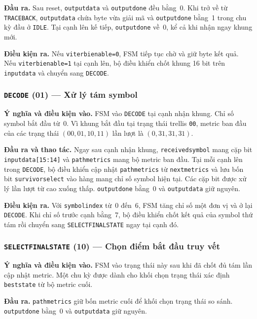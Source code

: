 \documentclass[12pt,a4paper]{article}
\renewcommand{\_}{\originalunderscore\allowbreak}
\begin{document}
\textbf{Đầu ra.} Sau reset, \texttt{output\_data} và \texttt{output\_done} đều bằng~0. Khi trở về từ \texttt{TRACEBACK}, \texttt{output\_data} chứa byte vừa giải mã và \texttt{output\_done} bằng~1 trong chu kỳ đầu ở \texttt{IDLE}. Tại cạnh lên kế tiếp, \texttt{output\_done} về~0, kể cả khi nhận ngay khung mới.

\textbf{Điều kiện ra.} Nếu \texttt{viterbi\_enable=0}, FSM tiếp tục chờ và giữ byte kết quả. Nếu \texttt{viterbi\_enable=1} tại cạnh lên, bộ điều khiển chốt khung 16 bit trên \texttt{input\_data} và chuyển sang \texttt{DECODE}.

\subsubsection{\texttt{DECODE} (01) --- Xử lý tám symbol}
\textbf{Ý nghĩa và điều kiện vào.} FSM vào \texttt{DECODE} tại cạnh nhận khung. Chỉ số symbol bắt đầu từ~0. Vì khung bắt đầu tại trạng thái trellis \texttt{00}, metric ban đầu của các trạng thái $(00,01,10,11)$ lần lượt là $(0,31,31,31)$.

\textbf{Đầu ra và thao tác.} Ngay sau cạnh nhận khung, \texttt{received\_symbol} mang cặp bit \texttt{input\_data[15:14]} và \texttt{path\_metrics} mang bộ metric ban đầu. Tại mỗi cạnh lên trong \texttt{DECODE}, bộ điều khiển cập nhật \texttt{path\_metrics} từ \texttt{next\_metrics} và lưu bốn bit \texttt{survivor\_select} vào hàng mang chỉ số symbol hiện tại. Các cặp bit được xử lý lần lượt từ cao xuống thấp. \texttt{output\_done} bằng~0 và \texttt{output\_data} giữ nguyên.

\textbf{Điều kiện ra.} Với \texttt{symbol\_index} từ~0 đến~6, FSM tăng chỉ số một đơn vị và ở lại \texttt{DECODE}. Khi chỉ số trước cạnh bằng~7, bộ điều khiển chốt kết quả của symbol thứ tám rồi chuyển sang \texttt{SELECT\_FINAL\_STATE} ngay tại cạnh đó.

\subsubsection{\texttt{SELECT\_FINAL\_STATE} (10) --- Chọn điểm bắt đầu truy vết}
\textbf{Ý nghĩa và điều kiện vào.} FSM vào trạng thái này sau khi đã chốt đủ tám lần cập nhật metric. Một chu kỳ được dành cho khối chọn trạng thái xác định \texttt{best\_state} từ bộ metric cuối.

\textbf{Đầu ra.} \texttt{path\_metrics} giữ bốn metric cuối để khối chọn trạng thái so sánh. \texttt{output\_done} bằng~0 và \texttt{output\_data} giữ nguyên.
\end{document}
